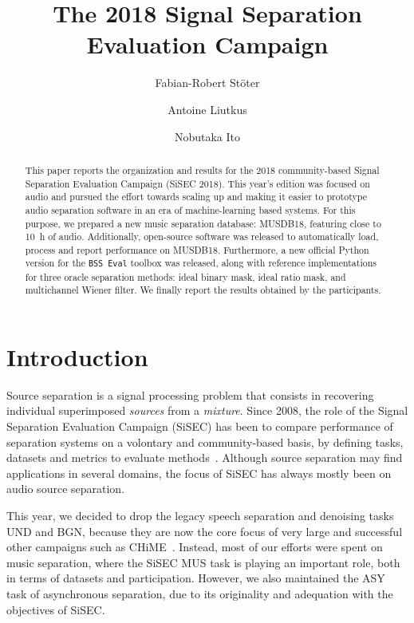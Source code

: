 \documentclass{llncs}
\begin{document}
\title{The 2018 Signal Separation Evaluation Campaign}
\author{
Fabian-Robert St\"{o}ter \and
Antoine Liutkus \and
Nobutaka Ito
}


\maketitle
%
\vspace{-3mm}
\begin{abstract}
This paper reports the organization and results for the 2018 community-based Signal Separation Evaluation Campaign (SiSEC 2018). This year's edition was focused on audio and pursued the effort towards scaling up and making it easier to prototype audio separation software in an era of machine-learning based systems. For this purpose, we prepared a new music separation database: MUSDB18, featuring close to 10~h of audio. Additionally, open-source software was released to automatically load, process and report performance on MUSDB18. Furthermore, a new official Python version for the \texttt{BSS~Eval} toolbox was released, along with reference implementations for three oracle separation methods: ideal binary mask, ideal ratio mask, and multichannel Wiener filter. We finally report the results obtained by the participants.
\end{abstract}

\setcounter{footnote}{0}
\section{Introduction}
\vspace{-2mm}
Source separation is a signal processing problem that consists in recovering individual superimposed \textit{sources} from a \textit{mixture}.  Since 2008, the role of the Signal Separation Evaluation Campaign (SiSEC) has been to compare performance of separation systems on a volontary and community-based basis, by defining tasks, datasets and metrics to evaluate methods~\cite{sassec2007,sisec2008,sisec0710,sisec2011,sisec2013,sisec2015,sisec2016}. Although source separation may find applications in several domains, the focus of SiSEC has always mostly been on audio source separation.

This year, we decided to drop the legacy speech separation and denoising tasks UND and BGN, because they are now the core focus of very large and successful other campaigns such as CHiME~\cite{chime,chime2,chime3}. Instead, most of our efforts were spent on music separation, where the SiSEC MUS task is playing an important role, both in terms of datasets and participation. However, we also maintained the ASY task of asynchronous separation, due to its originality and adequation with the objectives of SiSEC.
\end{document}
